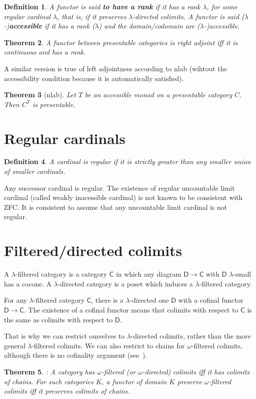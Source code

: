 \documentclass{article}
\newcommand{\CC}{\mathsf{C}}
\newcommand{\DD}{\mathsf{D}}
\newtheorem{theorem}{Theorem}[section]
\newtheorem{definition}[theorem]{Definition}
\begin{document}
\begin{definition}
 A functor is said \textbf{to have a rank}  if it has a rank $\lambda$,
 for some regular cardinal $\lambda$, that is, if it
  preserves $\lambda$-directed colimits.
  A functor is said ($\lambda$-)\textbf{accessible} if it has a rank ($\lambda$) and the domain/codomain
  are ($\lambda$-)accessible.
\end{definition}
\begin{theorem}
  \cite[1.66]{adamek_rosicky}
  A functor between presentable categories is right adjoint iff it is continuous
  and has a rank.
  \end{theorem}
  A similar version is true of left adjointness according to nlab (wihtout the
  accessibility condition because it is automatically satisfied).
  \begin{theorem}[nlab]
   Let $T$  be an accessible monad on a presentable category $C$.
   Then $C^T$ is presentable.
  \end{theorem}

\section{Regular cardinals}
\begin{definition}
 A cardinal is regular if it is strictly greater than any smaller union of smaller cardinals.
\end{definition}
Any successor cardinal is regular. The existence of regular uncountable limit
cardinal (called weakly inacessible cardinal) is not known to be consistent with
ZFC. It is consistent to assume that any uncountable limit cardinal is not regular.

\section{Filtered/directed colimits}
A $\lambda$-filtered category is a category $\CC$ in which any diagram
$\DD\to \CC$ with $\DD$ $\lambda$-small has a cocone. A $\lambda$-directed
category is a poset which induces a $\lambda$-filtered category.

For any $\lambda$-filtered category $\CC$, there is a $\lambda$-directed one
$\DD$ with a cofinal functor $\DD\to\CC$. The existence of a cofinal functor
means that colimits with respect to $\CC$ is the same as colimits with respect
to $\DD$.

That is why we can restrict ourselves to $\lambda$-directed colimits, rather
than the more general $\lambda$-filtered colimits. We can also restrict to
chains for $\omega$-filtered colimits, although there is no cofinality argument
(see~\cite[Example 1.8]{adamek_rosicky}).
\begin{theorem}
 \cite[Corollary 1.7]{adamek_rosicky}:
 A category has $\omega$-filtered (or $\omega$-directed) colimits iff it has
 colimits of chains. For such categories $K$, a functor of domain $K$ preserve
 $\omega$-filtered colimits iff it preserves colimits of chains.
\end{theorem}
\end{document}
